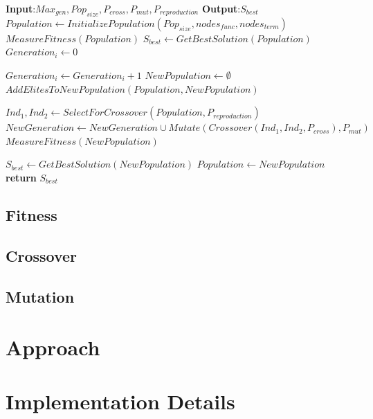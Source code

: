 \documentclass[runningheads]{llncs}
\begin{document}
\begin{algorithmic}
   \State \textbf{Input}:$Max_{gen},Pop_{size},P_{cross},P_{mut},P_{reproduction}$
   \State \textbf{Output}:$S_{best}$
   \State $Population\gets InitializePopulation(Pop_{size},nodes_{func},nodes_{term})$
   \State $MeasureFitness(Population)$
   \State $S_{best} \gets GetBestSolution(Population)$
   \State $Generation_{i} \gets 0$
   
      \State $Generation_{i} \gets Generation_{i} + 1$
      \State $NewPopulation \gets \emptyset$
      \State $AddElitesToNewPopulation(Population,NewPopulation)$
   
         \State $Ind_{1}, Ind_{2} \gets SelectForCrossover(Population, P_{reproduction})$
         \State $NewGeneration \gets NewGeneration \cup Mutate(Crossover(Ind_{1},Ind_{2},P_{cross}),P_{mut})$
         \State $MeasureFitness(NewPopulation)$
      \EndWhile
      
      \State $S_{best} \gets GetBestSolution(NewPopulation)$
      \State $Population \gets NewPopulation$
   \EndWhile
   \State \textbf{return} $S_{best}$
\end{algorithmic}

\subsection{Fitness}

\subsection{Crossover}

\subsection{Mutation}

\section{Approach}



\section{Implementation Details}
\end{document}
